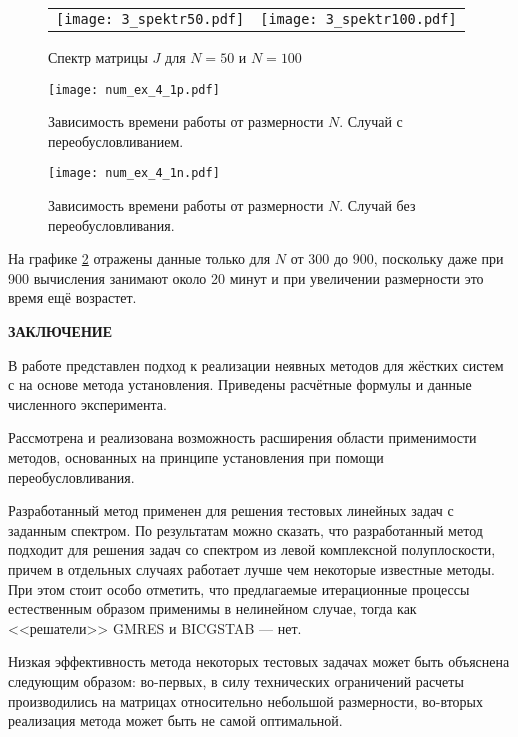 \documentclass[a4paper, 14pt]{extreport} %
\newcommand{\empline}{\mbox{}\newline}
\newcommand{\likechapterheading}[1]{
     \begin{center}
     \textbf{\MakeUppercase{#1}}
     \end{center}
     \empline}
\newcommand{\likechapter}[1]{
     \likechapterheading{#1}
     \addcontentsline{toc}{likechapter}{\MakeUppercase{#1}}}
\begin{document}
\begin{figure}[H]
\begin{tabular}{cc}
\texttt{[image: 3\_spektr50.pdf]}& \texttt{[image: 3\_spektr100.pdf]}
\end{tabular}
\caption{\small Спектр матрицы $J$ для $N = 50$  и $N = 100$}
\label{j_spektrum_3_exp}
\end{figure}

\begin{figure}[H]
\texttt{[image: num\_ex\_4\_1p.pdf]}
\caption{\small Зависимость времени работы от размерности $N$. Случай с переобусловливанием.}
\label{exp_3_1p}
\end{figure}

\begin{figure}[H]
\texttt{[image: num\_ex\_4\_1n.pdf]}
\caption{\small Зависимость времени работы от размерности $N$. Случай  без переобусловливания.}
\label{exp_3_1n}
\end{figure}

На графике \ref{exp_3_1p} отражены данные только для $N$ от 300 до 900, поскольку даже при 900 вычисления занимают около 20 минут и при увеличении размерности это время ещё возрастет.

\newpage
\likechapter{ЗАКЛЮЧЕНИЕ}

 В работе представлен подход к реализации неявных методов для жёстких систем с на основе метода установления. Приведены расчётные формулы и данные численного эксперимента.

Рассмотрена и реализована возможность расширения области
применимости методов, основанных на принципе установления при помощи
переобусловливания.

Разработанный метод применен для решения  тестовых линейных задач с
заданным спектром. По результатам можно сказать, что разработанный
метод подходит для решения задач со спектром из левой комплексной
полуплоскости, причем в отдельных случаях работает лучше чем
некоторые известные методы. При этом стоит особо отметить, что
предлагаемые итерационные процессы естественным образом применимы в
нелинейном случае, тогда как <<решатели>> GMRES и BICGSTAB --- нет.

Низкая эффективность  метода некоторых тестовых задачах может быть
объяснена следующим образом: во-первых, в силу технических
ограничений расчеты производились на матрицах относительно небольшой
размерности, во-вторых реализация метода может быть не самой
оптимальной.
\end{document}
